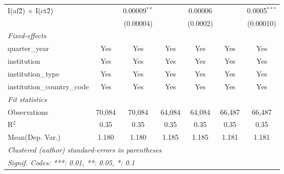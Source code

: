 \begin{tabular}{lcccccc}
   I(af\^2) $\times$ I(ct\^2)         &               & 0.00009$^{**}$ &               & 0.00006        &               & 0.0005$^{***}$\\   
                                      &               & (0.00004)      &               & (0.0002)       &               & (0.00010)\\   
   \midrule
   \emph{Fixed-effects}\\
   quarter\_year                      & Yes           & Yes            & Yes           & Yes            & Yes           & Yes\\  
   institution                        & Yes           & Yes            & Yes           & Yes            & Yes           & Yes\\  
   institution\_type                  & Yes           & Yes            & Yes           & Yes            & Yes           & Yes\\  
   institution\_country\_code         & Yes           & Yes            & Yes           & Yes            & Yes           & Yes\\  
   \midrule
   \emph{Fit statistics}\\
   Observations                       & 70,084        & 70,084         & 64,084        & 64,084         & 66,487        & 66,487\\  
   R$^2$                              & 0.35          & 0.35           & 0.35          & 0.35           & 0.35          & 0.35\\  
Mean(Dep. Var.) & 1.180 & 1.180 & 1.185 & 1.185 & 1.181 & 1.181 \\
   \midrule \midrule
   \multicolumn{7}{l}{\emph{Clustered (author) standard-errors in parentheses}}\\
   \multicolumn{7}{l}{\emph{Signif. Codes: ***: 0.01, **: 0.05, *: 0.1}}\\
\end{tabular}
\par\endgroup
